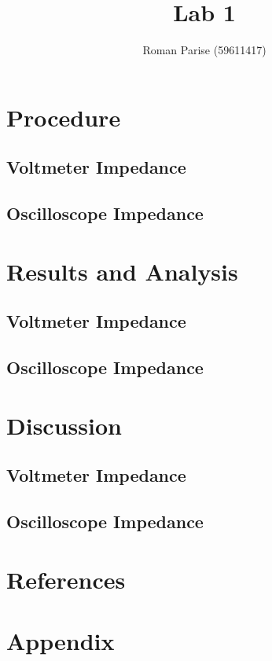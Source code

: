 \documentclass[a4paper,titlepage,10pt]{article}
\title{Lab 1}
\author{Roman Parise (59611417)}
\begin{document}
\maketitle

\section{Procedure}
\subsection{Voltmeter Impedance}
\subsection{Oscilloscope Impedance}

\section{Results and Analysis}
\subsection{Voltmeter Impedance}
\subsection{Oscilloscope Impedance}


\section{Discussion}
\subsection{Voltmeter Impedance}
\subsection{Oscilloscope Impedance}


\section{References}

\section{Appendix}

\end{document}
